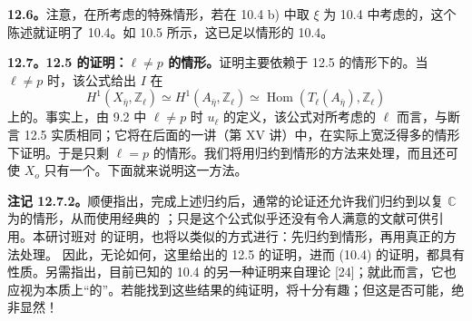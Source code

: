 \textbf{12.6。}注意，在所考虑的特殊情形，若在 10.4 b) 中取 $\xi$ 为 10.4 中考虑的，这个陈述就证明了 10.4。如 10.5 所示，这已足以情形的 10.4。

\textbf{12.7。12.5 的证明：$\ell\ne p$ 的情形。}证明主要依赖于 12.5 的情形下的。当 $\ell\ne p$ 时，该公式给出 $I$ 在
\[
 H^1(X_{\bar\eta},\mathbb Z_\ell)
 \simeq H^1(A_{\bar\eta},\mathbb Z_\ell)
 \simeq\operatorname{Hom}(T_\ell(A_{\bar\eta}),\mathbb Z_\ell)\tag{12.7.1}
\]
上的。事实上，由 9.2 中 $\ell\ne p$ 时 $u_\ell$ 的定义，该公式对所考虑的 $\ell$ 而言，与断言 12.5 实质相同；它将在后面的一讲（第 XV 讲）中，在实际上宽泛得多的情形下证明。于是只剩 $\ell=p$ 的情形。我们将用归约到情形的方法来处理，而且还可使 $X_o$ 只有一个。下面就来说明这一方法。

\textbf{注记 12.7.2。}顺便指出，完成上述归约后，通常的论证还允许我们归约到以复 $\mathbb C$ 为的情形，从而使用经典的 ；只是这个公式似乎还没有令人满意的文献可供引用。本研讨班对 的证明，也将以类似的方式进行：先归约到情形，再用真正的方法处理。
因此，无论如何，这里给出的 12.5 的证明，进而 (10.4) 的证明，都具有性质。另需指出，目前已知的 10.4 的另一种证明来自理论 [24]；就此而言，它也应视为本质上“的”。若能找到这些结果的纯证明，将十分有趣；但这是否可能，绝非显然！

